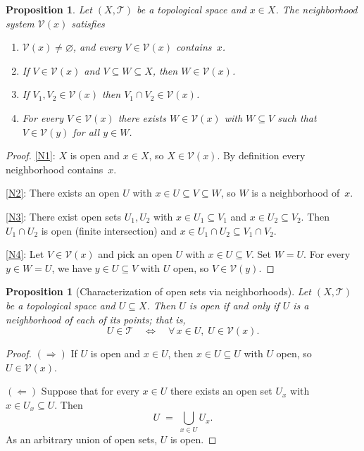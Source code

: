 \documentclass[11pt,a4paper,twoside]{book}
\newtheorem{proposition}[theorem]{Proposition}
\theoremstyle{remark}
\theoremstyle{definition}
\theoremstyle{definition}
\newcommand{\Tau}{\mathcal{T}}           %
\newcommand{\Nbhd}{\mathcal{V}}          %
\begin{document}
\begin{proposition}\label{prop:neighborhood-properties}
Let $(X,\Tau)$ be a topological space and $x\in X$.  The neighborhood system
$\Nbhd(x)$ satisfies
\begin{enumerate}[label=\textup{(N\arabic*)}]
  \item\label{N1} $\Nbhd(x)\neq\varnothing$, and every $V\in\Nbhd(x)$
        contains~$x$.
  \item\label{N2} If $V\in\Nbhd(x)$ and $V\subseteq W\subseteq X$, then
        $W\in\Nbhd(x)$.
  \item\label{N3} If $V_1,V_2\in\Nbhd(x)$ then $V_1\cap V_2\in\Nbhd(x)$.
  \item\label{N4} For every $V\in\Nbhd(x)$ there exists $W\in\Nbhd(x)$ with
        $W\subseteq V$ such that $V\in\Nbhd(y)$ for all $y\in W$.
\end{enumerate}
\end{proposition}
\begin{proof}
\ref{N1}: $X$ is open and $x\in X$, so $X\in\Nbhd(x)$.  By definition every
neighborhood contains~$x$.

\ref{N2}: There exists an open $U$ with $x\in U\subseteq V\subseteq W$, so $W$
is a neighborhood of~$x$.

\ref{N3}: There exist open sets $U_1,U_2$ with $x\in U_1\subseteq V_1$ and
$x\in U_2\subseteq V_2$.  Then $U_1\cap U_2$ is open (finite intersection) and
$x\in U_1\cap U_2\subseteq V_1\cap V_2$.

\ref{N4}: Let $V\in\Nbhd(x)$ and pick an open $U$ with $x\in U\subseteq V$.
Set $W=U$.  For every $y\in W=U$, we have $y\in U\subseteq V$ with $U$ open,
so $V\in\Nbhd(y)$.
\end{proof}

\begin{proposition}[Characterization of open sets via neighborhoods]
\label{prop:open-iff-nbhd}
Let $(X,\Tau)$ be a topological space and $U\subseteq X$.  Then $U$ is open
if and only if $U$ is a neighborhood of each of its points; that is,
\[
  U\in\Tau
  \quad\Longleftrightarrow\quad
  \forall\, x\in U,\; U\in\Nbhd(x).
\]
\end{proposition}

\begin{proof}
$(\Rightarrow)$\; If $U$ is open and $x\in U$, then $x\in U\subseteq U$ with
$U$ open, so $U\in\Nbhd(x)$.

$(\Leftarrow)$\; Suppose that for every $x\in U$ there exists an open set
$U_x$ with $x\in U_x\subseteq U$.  Then
\[
  U \;=\; \bigcup_{x\in U} U_x.
\]
As an arbitrary union of open sets, $U$ is open.
\end{proof}
\end{document}
